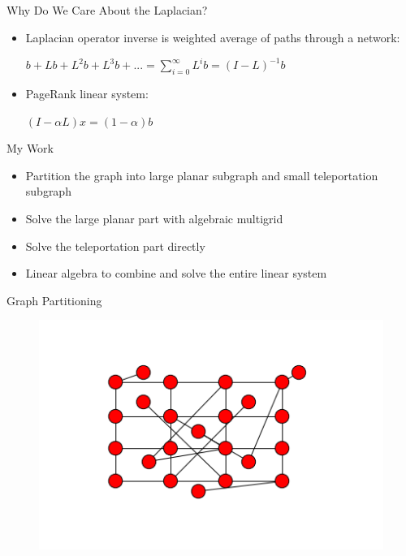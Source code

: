 \documentclass[xcolor=dvipsnames,10pt]{beamer}
\begin{document}

\begin{frame}{Why Do We Care About the Laplacian?}
\begin{itemize}
\item
Laplacian operator inverse is weighted average of paths through a network:\\
\vspace{.2in}
\Large
\begin{center}
$b + Lb + L^{2}b + L^{3}b + ... = \sum_{i=0}^{\infty} L^{i}b = (I - L)^{-1}b$\\
\end{center}
\vspace{.4in}
\normalsize
\item
PageRank linear system:\\
\vspace{.2in}
\Large
\begin{center}
$(I - \alpha L)x = (1 - \alpha)b$
\end{center}
\normalsize
\end{itemize}

\end{frame}
\begin{frame}{My Work}
\begin{itemize}
\item
Partition the graph into large planar subgraph and small teleportation subgraph
\vspace{.1in}
\item
Solve the large planar part with algebraic multigrid
\vspace{.1in}
\item
Solve the teleportation part directly
\vspace{.1in}
\item
Linear algebra to combine and solve the entire linear system
\vspace{.1in}
\end{itemize}
\end{frame}
\begin{frame}{Graph Partitioning}
\begin{figure}
\begin{center}
\includegraphics[width = 4.5in]{entiregraph.png}
\end{center}
\end{figure}
\end{frame}
\end{document}
